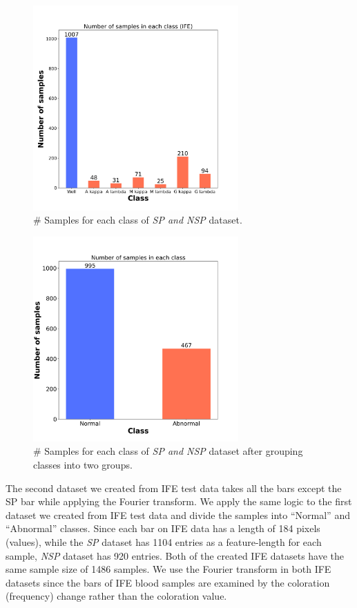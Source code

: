 \begin{figure}[H]
    \centering
    \includegraphics[width=0.7\textwidth]{images/sample/IFE_1.png}
    \caption{\# Samples for each class of \textit{SP and NSP} dataset.}
    \label{sife1}
\end{figure}

\begin{figure}[H]
    \centering
    \includegraphics[width=0.7\textwidth]{images/sample/IFE_2.png}
    \caption{\# Samples for each class of \textit{SP and NSP} dataset after grouping classes into two groups.}
    \label{sife2}
\end{figure}

The second dataset we created from IFE test data takes all the bars except the SP bar while applying the Fourier transform. We apply the same logic to the first dataset we created from IFE test data and divide the samples into “Normal” and “Abnormal” classes. Since each bar on IFE data has a length of 184 pixels (values), while the \textit{SP} dataset has 1104 entries as a feature-length for each sample, \textit{NSP} dataset has 920 entries. Both of the created IFE datasets have the same sample size of 1486 samples. We use the Fourier transform in both IFE datasets since the bars of IFE blood samples are examined by the coloration (frequency) change rather than the coloration value.


